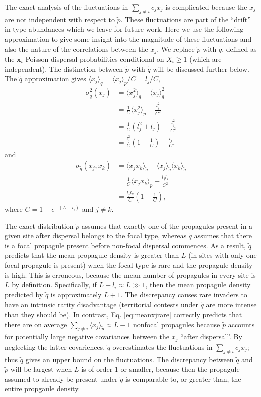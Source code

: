 \documentclass[11pt]{article}
\begin{document}
The exact analysis of the fluctuations in $\sum_{j\neq i} c_j x_j$ is complicated because the $x_j$ are not independent with respect to $\tilde{p}$. These fluctuations are part of the ``drift'' in type abundances which we leave for future work. Here we use the following approximation to give some insight into the magnitude of these fluctuations and also the nature of the correlations between the $x_j$. We replace $\tilde{p}$ with $\tilde{q}$, defined as the ${\mathbf x_i}$ Poisson dispersal probabilities conditional on $X_i\geq1$ (which are independent). The distinction between $\tilde{p}$ with $\tilde{q}$ will be discussed further below. The $\tilde{q}$ approximation gives $\langle x_j \rangle_{\tilde{q}}=\langle x_j \rangle_p/C=l_j/C$, 
\begin{align}
\sigma_{\tilde{q}}^2(x_j)&=\langle x_j^2 \rangle_{\tilde{q}}-\langle x_j \rangle_{\tilde{q}}^2\nonumber\\
&=\frac{1}{C}\langle x_j^2 \rangle_p-\frac{l_j^2}{C^2}\nonumber \\
&=\frac{1}{C}(l_j^2 + l_j)-\frac{l_j^2}{C^2}\nonumber \\
&=\frac{l_j^2}{C}\left(1-\frac{1}{C}\right)+\frac{l_j}{C},\label{eq:varr}
\end{align}
and 
\begin{align}
\sigma_{\tilde{q}}(x_j,x_k)&=\langle x_j x_k \rangle_{\tilde{q}}-\langle x_j \rangle_{\tilde{q}}\langle x_k \rangle_{\tilde{q}}\nonumber\\
&=\frac{1}{C}\langle x_j x_k \rangle_p-\frac{l_jl_k}{C^2}\nonumber\\
&=\frac{l_j l_k}{C}\left(1-\frac{1}{C}\right),\label{eq:covr}
\end{align}
where $C=1-e^{-(L-l_i)}$ and $j\neq k$. 

The exact distribution $\tilde{p}$ assumes that exactly one of the  propagules present in a given site after dispersal belongs to the focal type, whereas $\tilde{q}$ assumes that there is a focal propagule present before non-focal dispersal commences. As a result, $\tilde{q}$ predicts that the mean propagule density is greater than $L$ (in sites with only one focal propagule is present) when the focal type is rare and the propagule density is high. This is erroneous, because the mean number of propagules in every site is $L$ by definition. Specifically, if $L-l_i \approx L\gg 1$, then the mean propagule density predicted by $\tilde{q}$ is approximately $L+1$. The discrepancy causes rare invaders to have an intrinsic rarity disadvantage (territorial contests under $\tilde{q}$ are more intense than they should be). In contrast, Eq. \eqref{eq:meanxjrare} correctly predicts that there are on average $\sum_{j\neq i}\langle x_j \rangle_{\tilde{p}}\approx L-1$ nonfocal propagules because $\tilde{p}$ accounts for potentially large negative covariances between the $x_j$ ``after dispersal''. By neglecting the latter covariences, $\tilde{q}$ overestimates the fluctuations in $\sum_{j\neq i} c_j x_j$; thus $\tilde{q}$ gives an upper bound on the fluctuations. The discrepancy between $\tilde{q}$ and $\tilde{p}$ will be largest when $L$ is of order $1$ or smaller, because then the propagule assumed to already be present under $\tilde{q}$ is comparable to, or greater than, the entire propgaule density. 
\end{document}
